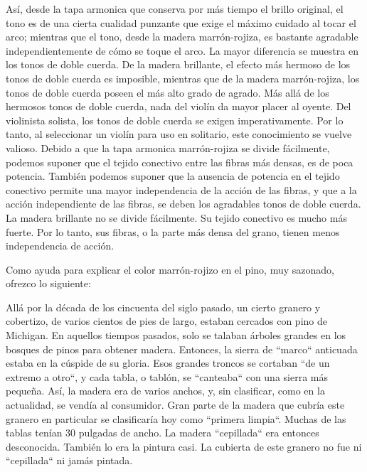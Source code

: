 \documentclass[12pt]{book}
\begin{document}
Así, desde la tapa armonica que conserva por más tiempo el brillo original, el tono es de una cierta cualidad punzante que exige el máximo cuidado al tocar el arco; mientras que el tono, desde la madera marrón-rojiza, es bastante agradable independientemente de cómo se toque el arco. La mayor diferencia se muestra en los tonos de doble cuerda. De la madera brillante, el efecto más hermoso de los tonos de doble cuerda es imposible, mientras que de la madera marrón-rojiza, los tonos de doble cuerda poseen el más alto grado de agrado. Más allá de los hermosos tonos de doble cuerda, nada del violín da mayor placer al oyente. Del violinista solista, los tonos de doble cuerda se exigen imperativamente. Por lo tanto, al seleccionar un violín para uso en solitario, este conocimiento se vuelve valioso. Debido a que la tapa armonica marrón-rojiza se divide fácilmente, podemos suponer que el tejido conectivo entre las fibras más densas, es de poca potencia. También podemos suponer que la ausencia de potencia en el tejido conectivo permite una mayor independencia de la acción de las fibras, y que a la acción independiente de las fibras, se deben los agradables tonos de doble cuerda. La madera brillante no se divide fácilmente. Su tejido conectivo es mucho más fuerte. Por lo tanto, sus fibras, o la parte más densa del grano, tienen menos independencia de acción.

Como ayuda para explicar el color marrón-rojizo en el pino, muy sazonado, ofrezco lo siguiente:

Allá por la década de los cincuenta del siglo pasado, un cierto granero y cobertizo, de varios cientos de pies de largo, estaban cercados con pino de Michigan. En aquellos tiempos pasados, solo se talaban árboles grandes en los bosques de pinos para obtener madera. Entonces, la sierra de ``marco`` anticuada estaba en la cúspide de su gloria. Esos grandes troncos se cortaban ``de un extremo a otro``, y cada tabla, o tablón, se ``canteaba`` con una sierra más pequeña. Así, la madera era de varios anchos, y, sin clasificar, como en la actualidad, se vendía al consumidor. Gran parte de la madera que cubría este granero en particular se clasificaría hoy como ``primera limpia``. Muchas de las tablas tenían 30 pulgadas de ancho. La madera ``cepillada`` era entonces desconocida. También lo era la pintura casi. La cubierta de este granero no fue ni ``cepillada`` ni jamás pintada.
\end{document}
